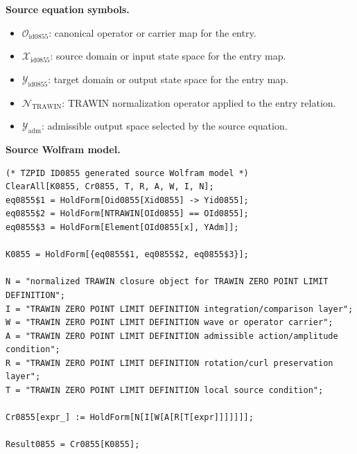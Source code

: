\begin{minipage}[t]{0.49\linewidth}
\begingroup
\small
\raggedright
\textbf{Source equation symbols.}\par
\begin{itemize}[leftmargin=1.35em,itemsep=1pt,topsep=1pt,parsep=0pt]
    \item $\mathcal{O}_{\mathrm{id0855}}$: canonical operator or carrier map for the entry.
    \item $\mathcal{X}_{\mathrm{id0855}}$: source domain or input state space for the entry map.
    \item $\mathcal{Y}_{\mathrm{id0855}}$: target domain or output state space for the entry map.
    \item $\mathcal{N}_{\mathrm{TRAWIN}}$: TRAWIN normalization operator applied to the entry relation.
    \item $\mathcal{Y}_{\mathrm{adm}}$: admissible output space selected by the source equation.
\end{itemize}
\endgroup
\end{minipage}\hfill
\begin{minipage}[t]{0.47\linewidth}
\begingroup
\scriptsize
\raggedright
\textbf{Source Wolfram model.}\par
\begin{Verbatim}[fontsize=\tiny,breaklines=true,breakanywhere=true]
(* TZPID ID0855 generated source Wolfram model *)
ClearAll[K0855, Cr0855, T, R, A, W, I, N];
eq0855$1 = HoldForm[Oid0855[Xid0855] -> Yid0855];
eq0855$2 = HoldForm[NTRAWIN[OId0855] == OId0855];
eq0855$3 = HoldForm[Element[OId0855[x], YAdm]];

K0855 = HoldForm[{eq0855$1, eq0855$2, eq0855$3}];

N = "normalized TRAWIN closure object for TRAWIN ZERO POINT LIMIT DEFINITION";
I = "TRAWIN ZERO POINT LIMIT DEFINITION integration/comparison layer";
W = "TRAWIN ZERO POINT LIMIT DEFINITION wave or operator carrier";
A = "TRAWIN ZERO POINT LIMIT DEFINITION admissible action/amplitude condition";
R = "TRAWIN ZERO POINT LIMIT DEFINITION rotation/curl preservation layer";
T = "TRAWIN ZERO POINT LIMIT DEFINITION local source condition";

Cr0855[expr_] := HoldForm[N[I[W[A[R[T[expr]]]]]]];

Result0855 = Cr0855[K0855];
\end{Verbatim}
\endgroup
\end{minipage}

